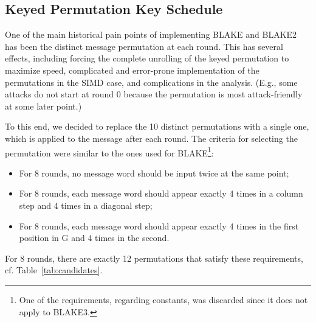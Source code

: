\documentclass[11pt,notitlepage,a4paper]{article}
\begin{document}
\subsection{Keyed Permutation Key Schedule}\label{sec:keysched}

One of the main historical pain points of implementing BLAKE and BLAKE2 has been the distinct message permutation at each round. This has several effects, including forcing the complete unrolling of the keyed permutation to maximize speed, complicated and error-prone implementation of the permutations in the SIMD case, and complications in the analysis. (E.g., some attacks do not start at round 0 because the permutation is most attack-friendly at some later point.)

To this end, we decided to replace the 10 distinct permutations with a single one, which is applied to the message after each round. The criteria for selecting the permutation were similar to the ones used for BLAKE\footnote{One of the requirements, regarding constants, was discarded since it does not apply to BLAKE3.}:
\begin{itemize}
  \item For 8 rounds, no message word should be input twice at the same point;
  \item For 8 rounds, each message word should appear exactly 4 times in a column step and 4 times in a diagonal step;
  \item For 8 rounds, each message word should appear exactly 4 times in the first position in G and 4 times in the second.
\end{itemize}
For 8 rounds, there are exactly 12 permutations that satisfy these requirements, cf. Table~\ref{tab:candidates}.
\end{document}
